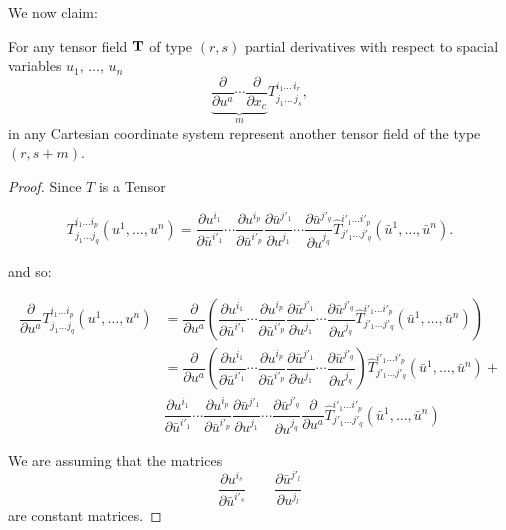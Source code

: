 We now claim:

\begin{theorem}
 For any tensor field $\bold T$ of type
$(r,s)$ partial derivatives  with respect to
spacial variables $u_1,\,\dots,\,u_n$ 
 \[
    \underbrace{\dfrac{\partial}{\partial u^a}\cdots \dfrac{\partial}{\partial x_c}}_{m}T^{i_1\ldots\,i_r}_{j_1\ldots\,j_s},
  \]
in any Cartesian coordinate
system represent another tensor field of the type
$(r,s+m)$.
\end{theorem}


\begin{proof}
Since $T$ is a Tensor

 \[T^{i_1\dots i_p}_{j_1\dots j_q}(u^1,\ldots,u^n) =
\dfrac{\partial u^{i_1}}{\partial \bar{u}^{i'_1}}
\cdots
\dfrac{\partial u^{i_p}}{\partial \bar{u}^{i'_p}}
\dfrac{\partial \bar{u}^{j'_{1}}}{\partial u^{j_{1}}}
\cdots
\dfrac{\partial \bar{u}^{j'_q}}{\partial u^{j_q}}
\hat{T}^{i'_1\dots i'_p}_{j'_{1}\dots j'_q}(\bar{u}^1,\ldots,\bar{u}^n)  .\]

and so:

\begin{align}
\dfrac{\partial}{\partial u^a}T^{i_1\dots i_p}_{j_1\dots j_q}(u^1,\ldots,u^n) & =
\dfrac{\partial}{\partial u^a}\left( \dfrac{\partial u^{i_1}}{\partial \bar{u}^{i'_1}}
\cdots
\dfrac{\partial u^{i_p}}{\partial \bar{u}^{i'_p}}
\dfrac{\partial \bar{u}^{j'_{1}}}{\partial u^{j_{1}}}
\cdots
\dfrac{\partial \bar{u}^{j'_q}}{\partial u^{j_q}}
\hat{T}^{i'_1\dots i'_p}_{j'_{1}\dots j'_q}(\bar{u}^1,\ldots,\bar{u}^n) \right)\\
&=\dfrac{\partial}{\partial u^a}\left( \dfrac{\partial u^{i_1}}{\partial \bar{u}^{i'_1}}
\cdots
\dfrac{\partial u^{i_p}}{\partial \bar{u}^{i'_p}}
\dfrac{\partial \bar{u}^{j'_{1}}}{\partial u^{j_{1}}}
\cdots
\dfrac{\partial \bar{u}^{j'_q}}{\partial u^{j_q}}\right)
\hat{T}^{i'_1\dots i'_p}_{j'_{1}\dots j'_q}(\bar{u}^1,\ldots,\bar{u}^n)+ \\
& \dfrac{\partial u^{i_1}}{\partial \bar{u}^{i'_1}}
\cdots
\dfrac{\partial u^{i_p}}{\partial \bar{u}^{i'_p}}
\dfrac{\partial \bar{u}^{j'_{1}}}{\partial u^{j_{1}}}
\cdots
\dfrac{\partial \bar{u}^{j'_q}}{\partial u^{j_q}} \dfrac{\partial}{\partial u^a}
\hat{T}^{i'_1\dots i'_p}_{j'_{1}\dots j'_q}(\bar{u}^1,\ldots,\bar{u}^n) 
\end{align}


We are assuming that the matrices 
   \[
\dfrac{\partial u^{i_s}}{\partial \bar{u}^{i'_s}} \qquad \dfrac{\partial \bar{u}^{j'_l}}{\partial u^{j_l}}
   \]
are constant matrices.



\end{proof}
